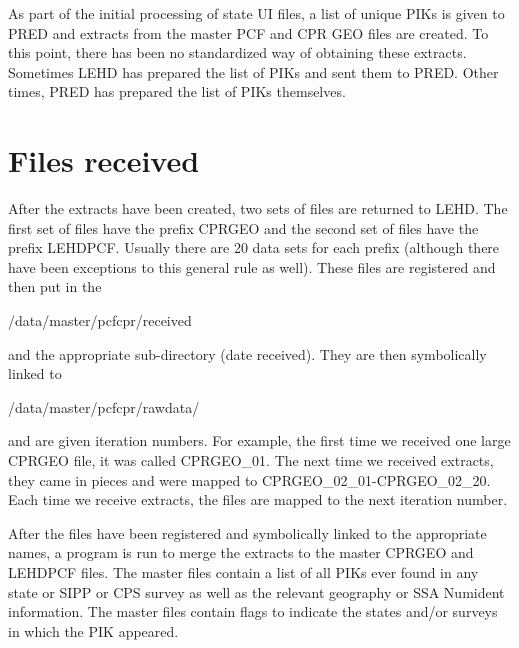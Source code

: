                       

%
%


As part of the initial processing of state UI files, a list of
unique PIKs is given to PRED and extracts from the
master PCF and CPR GEO files are created.  To this point, there
has been no standardized way of obtaining these extracts.  Sometimes LEHD
has prepared the list of PIKs and sent them to PRED.  Other times, PRED has
prepared the list of PIKs themselves.


\section{Files received}
\label{sec:pcf:files_received}


After the extracts have been created, two sets of files are returned to
LEHD.  The first set of files have the prefix CPRGEO and the
second set of files have the prefix LEHDPCF.  Usually there
are 20 data sets for each prefix (although there have been exceptions to
this general rule as well).  These files are registered and then put in the
\begin{center}
  /data/master/pcfcpr/received
\end{center}
and the appropriate sub-directory (date received).  They are then
symbolically linked to 
\begin{center}
  /data/master/pcfcpr/rawdata/
\end{center}
and are given iteration
numbers.  For example, the first time we received one large CPRGEO file, it
was called  CPRGEO\_01.  The next time we received extracts, they came in
pieces and were mapped to CPRGEO\_02\_01-CPRGEO\_02\_20.  Each time we receive
extracts, the files are mapped to the next iteration number.

After the files have been registered and symbolically linked to the
appropriate names, a program is run to merge the extracts to the master
CPRGEO and LEHDPCF files.  The master files contain a list of all PIKs ever
found in any state or SIPP or CPS survey as well as
the relevant geography or SSA Numident information.  The
master files contain flags to indicate the states and/or surveys in which
the PIK appeared.

